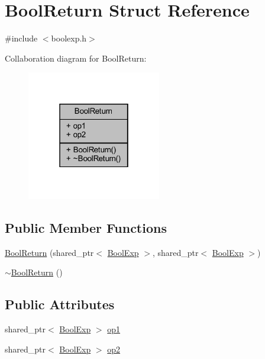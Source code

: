 \hypertarget{structBoolReturn}{}\section{Bool\+Return Struct Reference}
\label{structBoolReturn}


{\ttfamily \#include $<$boolexp.\+h$>$}



Collaboration diagram for Bool\+Return\+:
\nopagebreak
\begin{figure}[H]
\begin{center}
\leavevmode
\includegraphics[width=166pt]{structBoolReturn__coll__graph}
\end{center}
\end{figure}
\subsection*{Public Member Functions}
\begin{DoxyCompactItemize}
\item 
\mbox{\hyperlink{structBoolReturn_a1369d14d90011e707b0823656f7e2f55}{Bool\+Return}} (shared\+\_\+ptr$<$ \mbox{\hyperlink{classBoolExp}{Bool\+Exp}} $>$, shared\+\_\+ptr$<$ \mbox{\hyperlink{classBoolExp}{Bool\+Exp}} $>$)
\item 
\mbox{\hyperlink{structBoolReturn_ade34b5e173d4c599b9f273848d8582b4}{$\sim$\+Bool\+Return}} ()
\end{DoxyCompactItemize}
\subsection*{Public Attributes}
\begin{DoxyCompactItemize}
\item 
shared\+\_\+ptr$<$ \mbox{\hyperlink{classBoolExp}{Bool\+Exp}} $>$ \mbox{\hyperlink{structBoolReturn_a16f84cab94347ac45de9dac81a932a66}{op1}}
\item 
shared\+\_\+ptr$<$ \mbox{\hyperlink{classBoolExp}{Bool\+Exp}} $>$ \mbox{\hyperlink{structBoolReturn_aac386029dd2fe9c58e818c359143c124}{op2}}
\end{DoxyCompactItemize}


